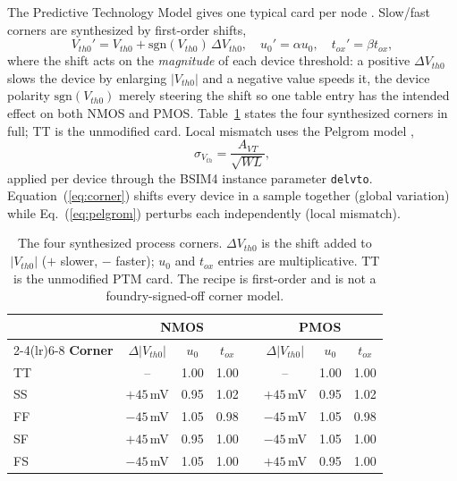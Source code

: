 \documentclass[11pt,a4paper]{article}
\begin{document}
The Predictive Technology Model gives one typical card per node
\cite{zhao2006ptm}. Slow/fast corners are synthesized by first-order shifts,
\begin{equation}
V_{th0}' = V_{th0} + \mathrm{sgn}(V_{th0})\,\Delta V_{th0},
\quad u_0' = \alpha u_0,
\quad t_{ox}' = \beta t_{ox},
\label{eq:corner}
\end{equation}
where the shift acts on the \emph{magnitude} of each device threshold: a positive
$\Delta V_{th0}$ slows the device by enlarging $|V_{th0}|$ and a negative value
speeds it, the device polarity $\mathrm{sgn}(V_{th0})$ merely steering the shift so
one table entry has the intended effect on both NMOS and PMOS.
Table~\ref{tab:corners} states the four synthesized corners in full; TT is the
unmodified card. Local mismatch uses the Pelgrom model
\cite{pelgrom1989matching},
\begin{equation}
\sigma_{V_{th}} = \frac{A_{VT}}{\sqrt{W L}},
\label{eq:pelgrom}
\end{equation}
applied per device through the BSIM4 instance parameter \texttt{delvto}.
Equation~(\ref{eq:corner}) shifts every device in a sample together (global
variation) while Eq.~(\ref{eq:pelgrom}) perturbs each independently (local
mismatch).

\begin{table}[!ht]
\centering
\caption{The four synthesized process corners. $\Delta V_{th0}$ is the shift added
to $|V_{th0}|$ ($+$ slower, $-$ faster); $u_0$ and $t_{ox}$ entries are
multiplicative. TT is the unmodified PTM card. The recipe is first-order and is not
a foundry-signed-off corner model.}
\label{tab:corners}
\footnotesize
\begin{tabular}{@{}l ccc c ccc@{}}
\toprule
& \multicolumn{3}{c}{\textbf{NMOS}} & & \multicolumn{3}{c}{\textbf{PMOS}} \\
\cmidrule(lr){2-4}\cmidrule(lr){6-8}
\textbf{Corner} & $\Delta|V_{th0}|$ & $u_0$ & $t_{ox}$ & &
$\Delta|V_{th0}|$ & $u_0$ & $t_{ox}$ \\
\midrule
TT & --          & 1.00 & 1.00 & & --          & 1.00 & 1.00 \\
SS & $+45$\,mV    & 0.95 & 1.02 & & $+45$\,mV    & 0.95 & 1.02 \\
FF & $-45$\,mV    & 1.05 & 0.98 & & $-45$\,mV    & 1.05 & 0.98 \\
SF & $+45$\,mV    & 0.95 & 1.00 & & $-45$\,mV    & 1.05 & 1.00 \\
FS & $-45$\,mV    & 1.05 & 1.00 & & $+45$\,mV    & 0.95 & 1.00 \\
\bottomrule
\end{tabular}
\end{table}
\end{document}
